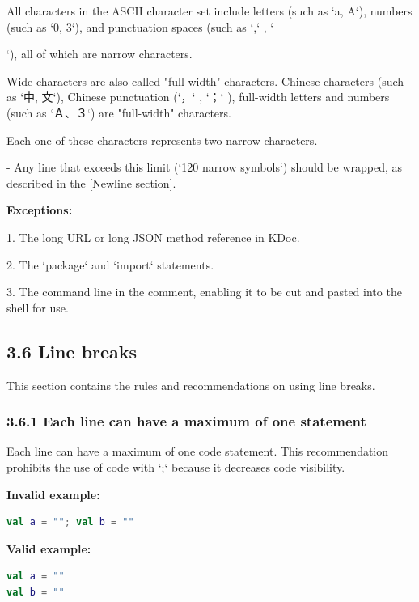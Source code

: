 All characters in the ASCII character set include letters (such as `a, A`), numbers (such as `0, 3`), and punctuation spaces (such as `,` , `{`), all of which are narrow characters.

Wide characters are also called "full-width" characters. Chinese characters (such as `中, 文`), Chinese punctuation (`，` , `；` ), full-width letters and numbers (such as `Ａ、３`) are "full-width" characters.

Each one of these characters represents two narrow characters.



- Any line that exceeds this limit (`120 narrow symbols`) should be wrapped, as described in the [Newline section]. 



\textbf{Exceptions:}



1.	The long URL or long JSON method reference in KDoc.

2.	The `package` and `import` statements.

3.	The command line in the comment, enabling it to be cut and pasted into the shell for use.



\subsection*{\textbf{3.6 Line breaks}}

This section contains the rules and recommendations on using line breaks.

\subsubsection*{\textbf{3.6.1 Each line can have a maximum of one statement}}
\leavevmode\newline

Each line can have a maximum of one code statement. This recommendation prohibits the use of code with `;` because it decreases code visibility.



\textbf{Invalid example:}

\begin{lstlisting}[language=Kotlin]
val a = ""; val b = ""
\end{lstlisting}


\textbf{Valid example:}

\begin{lstlisting}[language=Kotlin]
val a = ""
val b = ""
\end{lstlisting}


}
